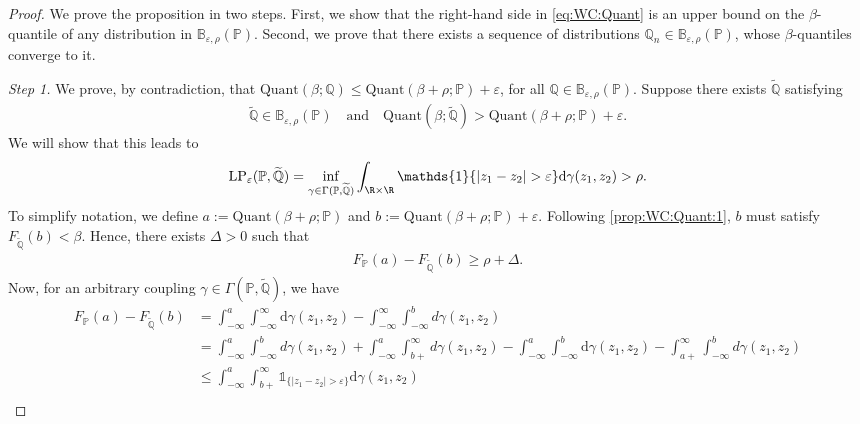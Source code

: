\documentclass[11pt,a4paper]{article}
\begin{document}
\begin{proof}
We prove the proposition in two steps. First, we show that the right-hand side in \eqref{eq:WC:Quant} is an upper bound on the $\beta$-quantile of any distribution in $\mathbb{B}_{\varepsilon, \rho}(\mathbb P)$. Second, we prove that there exists a sequence of distributions $\mathbb Q
_n \in \mathbb{B}_{\varepsilon, \rho}(\mathbb P)$, whose $\beta$-quantiles converge to it. 

\medskip

\noindent\emph{Step 1.} We prove, by contradiction, that $\text{Quant}(\beta;\mathbb Q) \leq \text{Quant}(\beta+\rho; \mathbb P) + \varepsilon$, for all $\mathbb Q \in \mathbb{B}_{\varepsilon, \rho}(\mathbb P)$. Suppose there exists $\widetilde{\mathbb Q}$ satisfying 
\begin{align}
\label{prop:WC:Quant:1}
    \widetilde{\mathbb Q} \in \mathbb{B}_{\varepsilon, \rho}(\mathbb P) \quad \text{and} \quad \text{Quant}(\beta; \widetilde{\mathbb Q}) > \text{Quant}(\beta+\rho; \mathbb P) + \varepsilon.
\end{align} 
We will show that this leads to
\begin{align*}
    \text{LP}_\varepsilon(\mathbb P, \widetilde{\mathbb Q}) = \inf_{\gamma\in\Gamma(\mathbb P, \widetilde{\mathbb Q})}\int_{\R\times\R} \mathds{1}\{|z_1 - z_2| > \varepsilon\}\mathrm{d}\gamma(z_1,z_2) > \rho.
\end{align*}
To simplify notation, we define $a:=\text{Quant}(\beta+\rho; \mathbb P)$ and $b:=\text{Quant}(\beta+\rho; \mathbb P)+\varepsilon$. Following \eqref{prop:WC:Quant:1}, $b$ must satisfy $F_{\widetilde{\mathbb Q}}(b)< \beta$. Hence, there exists $\Delta >0$ such that
\begin{align*}
    F_{\mathbb P}(a)-F_{\widetilde{\mathbb Q}}(b) \geq \rho + \Delta.
\end{align*}
Now, for an arbitrary coupling $\gamma \in \Gamma(\mathbb P, \widetilde{\mathbb Q})$, we have 
\begin{align*}
    F_{\mathbb P}(a) - F_{\widetilde{\mathbb Q}}(b) &= \int_{-\infty}^{a}\int_{-\infty}^\infty \mathrm{d}\gamma(z_1,z_2) - \int_{-\infty}^\infty\int_{-\infty}^{b}d\gamma(z_1,z_2)\\
    &=\int_{-\infty}^{a}\int_{-\infty}^b d\gamma(z_1,z_2)+\int_{-\infty}^{a}\int_{b+}^\infty d\gamma(z_1,z_2)-\int_{-\infty}^a\int_{-\infty}^{b} \mathrm{d}\gamma(z_1,z_2)-\int_{a+}^\infty\int_{-\infty}^{b}d\gamma(z_1,z_2)\\
    &\leq\int_{-\infty}^{a}\int_{b+}^\infty \mathds{1}_{\{|z_1-z_2|> \varepsilon\}} \mathrm{d}\gamma(z_1,z_2)\\

\end{align*}
\end{proof}
\end{document}
